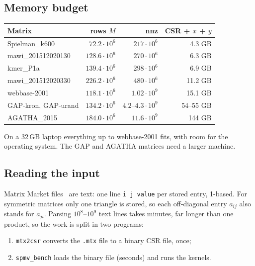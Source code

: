 \documentclass[11pt,a4paper]{article}
\begin{document}
\subsection{Memory budget}
\begin{center}
\small
\begin{tabular}{@{}lrrr@{}}
\toprule
Matrix & rows $M$ & nnz & CSR + $x$ + $y$ \\ \midrule
Spielman\_k600       & $72.2\cdot10^6$  & $217\cdot10^6$   & 4.3 GB \\
mawi\_201512020130   & $128.6\cdot10^6$ & $270\cdot10^6$   & 6.3 GB \\
kmer\_P1a            & $139.4\cdot10^6$ & $298\cdot10^6$   & 6.9 GB \\
mawi\_201512020330   & $226.2\cdot10^6$ & $480\cdot10^6$   & 11.2 GB \\
webbase-2001         & $118.1\cdot10^6$ & $1.02\cdot10^9$  & 15.1 GB \\
GAP-kron, GAP-urand  & $134.2\cdot10^6$ & $4.2$--$4.3\cdot10^9$ & 54--55 GB \\
AGATHA\_2015         & $184.0\cdot10^6$ & $11.6\cdot10^9$  & 144 GB \\
\bottomrule
\end{tabular}
\end{center}
On a 32\,GB laptop everything up to webbase-2001 fits, with room for the operating system.
The GAP and AGATHA matrices need a larger machine.

\subsection{Reading the input}
Matrix Market files~\cite{mm} are text: one line \texttt{i j value} per stored entry,
1-based. For symmetric matrices only one triangle is stored, so each off-diagonal entry
$a_{ij}$ also stands for $a_{ji}$. Parsing $10^8$--$10^9$ text lines takes minutes, far
longer than one product, so the work is split in two programs:
\begin{enumerate}
  \item \texttt{mtx2csr} converts the \texttt{.mtx} file to a binary CSR file, once;
  \item \texttt{spmv\_bench} loads the binary file (seconds) and runs the kernels.
\end{enumerate}
\end{document}

